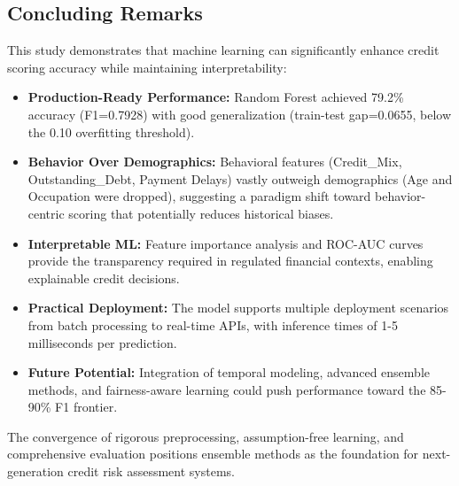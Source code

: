 \documentclass[11pt, a4paper]{article}
\begin{document}
\subsection{Concluding Remarks}

This study demonstrates that machine learning can significantly enhance credit scoring accuracy while maintaining interpretability:

\begin{itemize}
    \item \textbf{Production-Ready Performance:} Random Forest achieved 79.2\% accuracy (F1=0.7928) with good generalization (train-test gap=0.0655, below the 0.10 overfitting threshold).
    
    \item \textbf{Behavior Over Demographics:} Behavioral features (Credit\_Mix, Outstanding\_Debt, Payment Delays) vastly outweigh demographics (Age and Occupation were dropped), suggesting a paradigm shift toward behavior-centric scoring that potentially reduces historical biases.
    
    \item \textbf{Interpretable ML:} Feature importance analysis and ROC-AUC curves provide the transparency required in regulated financial contexts, enabling explainable credit decisions.
    
    \item \textbf{Practical Deployment:} The model supports multiple deployment scenarios from batch processing to real-time APIs, with inference times of 1-5 milliseconds per prediction.
    
    \item \textbf{Future Potential:} Integration of temporal modeling, advanced ensemble methods, and fairness-aware learning could push performance toward the 85-90\% F1 frontier.
\end{itemize}

The convergence of rigorous preprocessing, assumption-free learning, and comprehensive evaluation positions ensemble methods as the foundation for next-generation credit risk assessment systems.
\end{document}
